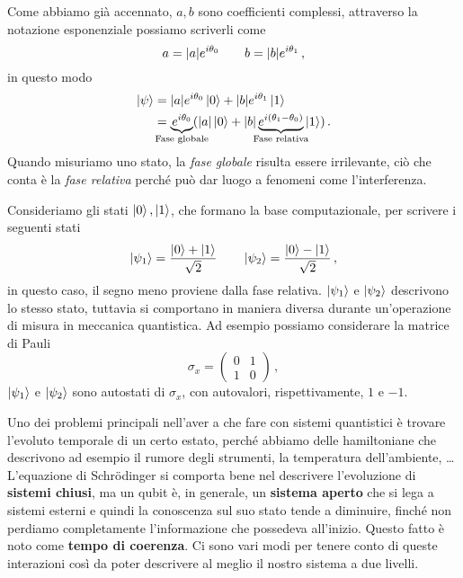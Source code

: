 Come abbiamo già accennato, $a,b$ sono coefficienti complessi, attraverso la notazione esponenziale possiamo scriverli come
\begin{equation*}
    a=\abs{a}e^{i\theta_0} \qquad b=\abs{b}e^{i\theta_1}\, ,
\end{equation*}
in questo modo
\begin{equation*}
    \begin{aligned}
        \ket \psi &= \abs{a}e^{i\theta_0}\ket 0 + \abs{b}e^{i\theta_1}\ket 1 \\
                  &= \underbrace{e^{i\theta_0}}_{\mathclap{\text{Fase globale}}}(\abs{a}\ket 0 + \abs{b}\underbrace{e^{i\left(\theta_1-\theta_0\right)}}_{\mathclap{\text{Fase relativa}}}\ket 1) \, .
    \end{aligned}
\end{equation*}
Quando misuriamo uno stato, la \textit{fase globale} risulta essere irrilevante, ciò che conta è la \textit{fase relativa} perché può dar luogo a fenomeni come l'interferenza.
\begin{esempio}
    Consideriamo gli stati $\ket 0, \ket 1$, che formano la base computazionale, per scrivere i seguenti stati
    \begin{equation*}
        \ket{\psi_1}=\frac{\ket 0 + \ket 1}{\sqrt 2} \qquad \ket{\psi_2}=\frac{\ket 0 - \ket 1}{\sqrt 2}\, ,
    \end{equation*}
    in questo caso, il segno meno proviene dalla fase relativa. $\ket{\psi_1}$ e $\ket{\psi_2}$ descrivono lo stesso stato, tuttavia si comportano in maniera diversa durante un'operazione di misura in meccanica quantistica. Ad esempio possiamo considerare la matrice di Pauli
    \begin{equation*}
        \sigma_x = \begin{pmatrix}
                    0 & 1 \\
                    1 & 0
                   \end{pmatrix}\, ,
    \end{equation*}
    $\ket{\psi_1}$ e $\ket{\psi_2}$ sono autostati di $\sigma_x$, con autovalori, rispettivamente, $1$ e $-1$.
\end{esempio}
\noindent Uno dei problemi principali nell'aver a che fare con sistemi quantistici è trovare l'evoluto temporale di un certo estato, perché abbiamo delle hamiltoniane che descrivono ad esempio il rumore degli strumenti, la temperatura dell'ambiente, \dots L'equazione di Schrödinger si comporta bene nel descrivere l'evoluzione di \textbf{sistemi chiusi}, ma un qubit è, in generale, un \textbf{sistema aperto} che si lega a sistemi esterni e quindi la conoscenza sul suo stato tende a diminuire, finché non perdiamo completamente l'informazione che possedeva all'inizio. Questo fatto è noto come \textbf{tempo di coerenza}. Ci sono vari modi per tenere conto di queste interazioni così da poter descrivere al meglio il nostro sistema a due livelli.\\
